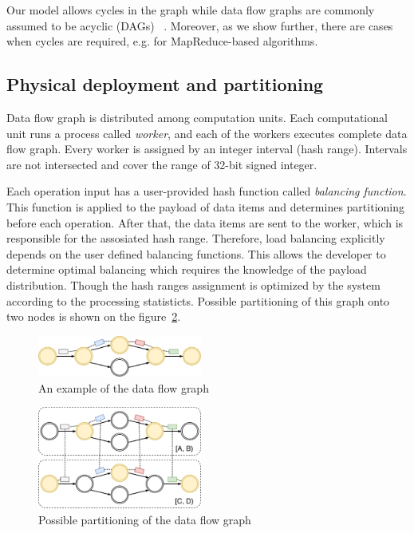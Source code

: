 Our model allows cycles in the graph while data flow graphs are commonly assumed to be acyclic (DAGs) 
~\cite{Zaharia:2016:ASU:3013530.2934664, Carbone:2017:SMA:3137765.3137777}. Moreover, as we show further, there are cases when cycles are required, e.g. for MapReduce-based algorithms. 

\subsection{Physical deployment and partitioning}
Data flow graph is distributed among computation units. Each computational unit runs a process called {\it worker}, and each of the workers executes complete data flow graph. Every worker is assigned by an integer interval (hash range). Intervals are not intersected and cover the range of 32-bit signed integer.

Each operation input has a user-provided hash function called {\it balancing function}. This function is applied to the payload of data items and determines partitioning before each operation. After that, the data items are sent to the worker, which is responsible for the assosiated hash range. Therefore, load balancing explicitly depends on the user defined balancing functions. This allows the developer to determine optimal balancing which requires the knowledge of the payload distribution. Though the hash ranges assignment is optimized by the system according to the processing statisticts. Possible partitioning of this graph onto two nodes is shown on the figure~\ref{physical-graph-figure}.

\begin{figure}[htbp]
  \centering
  \includegraphics[width=0.48\textwidth]{pics/logical-graph}
  \caption{An example of the data flow graph}
  \label {logical-graph-figure}
\end{figure}

\begin{figure}[htbp]
  \centering
  \includegraphics[width=0.48\textwidth]{pics/physical-graph}
  \caption{Possible partitioning of the data flow graph}
  \label {physical-graph-figure}
\end{figure}

